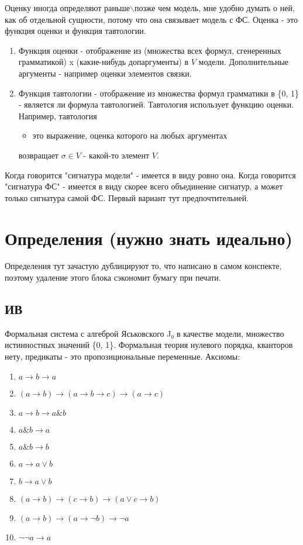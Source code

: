 \documentclass[12pt]{article}
\begin{document}
Оценку иногда определяют раньше$\backslash$позже чем модель, мне
удобно думать о ней, как об отдельной сущности, потому что
она связывает модель с ФС.
Оценка - это функция оценки и функция тавтологии.
\begin{enumerate}
\item Функция оценки - отображение из (множества всех формул,
сгенеренных грамматикой) x (какие-нибудь допаргументы)
в $V$ модели. Дополнительные аргументы - например оценки
элементов связки.
\item Функция тавтологии - отображение из множества формул
грамматики в \{0, 1\} - является ли формула тавтологией.
Тавтология использует функцию оценки. Например, тавтология
\begin{itemize}
\item это выражение, оценка которого на любых аргументах
\end{itemize}
возвращает $σ \in V$ - какой-то элемент $V$.
\end{enumerate}

Когда говорится "сигнатура модели" - имеется в виду ровно она.
Когда говорится "сигнатура ФС" - имеется в виду скорее всего
объединение сигнатур, а может только сигнатура самой ФС. Первый
вариант тут предпочтительней.
\section{Определения (нужно знать идеально)}
\label{sec-2}
Определения тут зачастую дублицируют то, что написано в самом
конспекте, поэтому удаление этого блока сэкономит бумагу при
печати.
\subsection{ИВ}
\label{sec-2-1}
Формальная система с алгеброй Яськовского J₀ в качестве модели, множество
истинностных значений \{0, 1\}. Формальная теория нулевого порядка, кванторов
нету, предикаты - это пропозициональные переменные.
Аксиомы:
\begin{enumerate}
\item $a \to b \to a$
\item $(a \to b) \to (a \to b \to c) \to (a \to c)$
\item $a \to b \to a \& b$
\item $a \& b \to a$
\item $a \& b \to b$
\item $a \to a \lor b$
\item $b \to a \lor b$
\item $(a \to b) \to (c \to b) \to (a \lor c \to b)$
\item $(a \to b) \to (a \to \lnot b) \to \lnot a$
\item $\lnot \lnot a \to a$
\end{enumerate}
\end{document}

